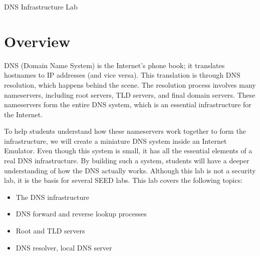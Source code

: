 
\newcommand{\commonfolder}{../../common-files}




\newcommand{\dnsFigs}{./Figs}


\usepackage{hyperref}




\begin{center}
{\LARGE DNS Infrastructure Lab}
\end{center}




\section{Overview}

DNS (Domain Name System) is the Internet's phone book; it
translates hostnames to IP addresses (and vice versa).
This translation is through DNS resolution, which happens behind
the scene. The resolution process involves many nameservers,
including root servers, TLD servers, and final domain servers.
These nameservers form the entire DNS system, which is an
essential infrastructure for the Internet.

To help students understand how these nameservers work together
to form the infrastructure, we will create a miniature DNS system
inside an Internet Emulator.
Even though this system is small, it has all the essential
elements of a real DNS infrastructure. By building such a system,
students will have a deeper understanding of how the DNS actually works.
Although this lab is not a security lab, it is the basis for
several SEED labs. This lab covers the following topics:

\begin{itemize}[noitemsep]
\item The DNS infrastructure
\item DNS forward and reverse lookup processes
\item Root and TLD servers
\item DNS resolver, local DNS server
\end{itemize}



